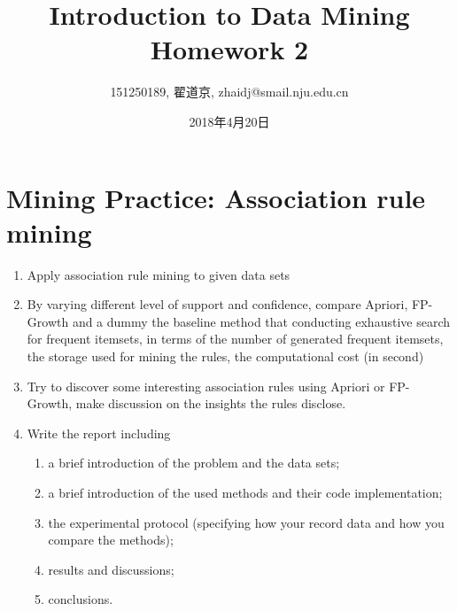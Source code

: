 \documentclass[a4paper,UTF8]{article}
\numberwithin{equation}{section}
\begin{document}
\title{Introduction to Data Mining\\
Homework 2}
\author{151250189, 翟道京, zhaidj@smail.nju.edu.cn}
\date{2018年4月20日}
\maketitle

\section{Mining Practice: Association rule mining}

\begin{enumerate}
\item Apply association rule mining to given data sets
\item  By varying different level of support and confidence, compare Apriori, FP-Growth and a dummy the baseline method that conducting exhaustive search for frequent itemsets, in terms of the number of generated frequent itemsets, the storage used for mining the rules, the computational cost (in second)
\item Try to discover some interesting association rules using Apriori or FP- Growth, make discussion on the insights the rules disclose.
\item Write the report including 
\begin{enumerate}
\item a brief introduction of the problem and the data sets;
\item a brief introduction of the used methods and their code implementation; 
\item the experimental protocol (specifying how your record data and how you compare the methods); 
\item results and discussions; 
\item conclusions.
\end{enumerate}
\end{enumerate}
\end{document}
